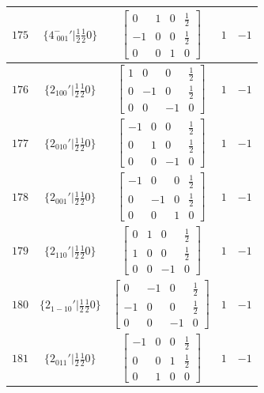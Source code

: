 \documentclass[fleqn,8pt]{jsarticle}
\begin{document}
\begin{longtable}{ccccc}
$ 175 $ & $ \{4^{-}_{\,\,001}{}'|\frac{1}{2} \frac{1}{2} 0\} $ & $ \begin{bmatrix} 0 & 1 & 0 & \frac{1}{2} \\ -1 & 0 & 0 & \frac{1}{2} \\ 0 & 0 & 1 & 0 \end{bmatrix} $ & $ 1 $ & $ -1 $ \\ \hline
$ 176 $ & $ \{2{}_{100}{}'|\frac{1}{2} \frac{1}{2} 0\} $ & $ \begin{bmatrix} 1 & 0 & 0 & \frac{1}{2} \\ 0 & -1 & 0 & \frac{1}{2} \\ 0 & 0 & -1 & 0 \end{bmatrix} $ & $ 1 $ & $ -1 $ \\ \hline
$ 177 $ & $ \{2{}_{010}{}'|\frac{1}{2} \frac{1}{2} 0\} $ & $ \begin{bmatrix} -1 & 0 & 0 & \frac{1}{2} \\ 0 & 1 & 0 & \frac{1}{2} \\ 0 & 0 & -1 & 0 \end{bmatrix} $ & $ 1 $ & $ -1 $ \\ \hline
$ 178 $ & $ \{2{}_{001}{}'|\frac{1}{2} \frac{1}{2} 0\} $ & $ \begin{bmatrix} -1 & 0 & 0 & \frac{1}{2} \\ 0 & -1 & 0 & \frac{1}{2} \\ 0 & 0 & 1 & 0 \end{bmatrix} $ & $ 1 $ & $ -1 $ \\ \hline
$ 179 $ & $ \{2{}_{110}{}'|\frac{1}{2} \frac{1}{2} 0\} $ & $ \begin{bmatrix} 0 & 1 & 0 & \frac{1}{2} \\ 1 & 0 & 0 & \frac{1}{2} \\ 0 & 0 & -1 & 0 \end{bmatrix} $ & $ 1 $ & $ -1 $ \\ \hline
$ 180 $ & $ \{2{}_{1-10}{}'|\frac{1}{2} \frac{1}{2} 0\} $ & $ \begin{bmatrix} 0 & -1 & 0 & \frac{1}{2} \\ -1 & 0 & 0 & \frac{1}{2} \\ 0 & 0 & -1 & 0 \end{bmatrix} $ & $ 1 $ & $ -1 $ \\ \hline
$ 181 $ & $ \{2{}_{011}{}'|\frac{1}{2} \frac{1}{2} 0\} $ & $ \begin{bmatrix} -1 & 0 & 0 & \frac{1}{2} \\ 0 & 0 & 1 & \frac{1}{2} \\ 0 & 1 & 0 & 0 \end{bmatrix} $ & $ 1 $ & $ -1 $ \\ \hline

\end{longtable}
\end{document}
